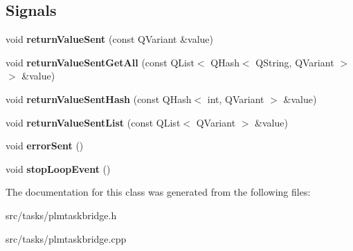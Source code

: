 \subsection*{Signals}
\begin{DoxyCompactItemize}
\item 
void {\bfseries return\+Value\+Sent} (const Q\+Variant \&value)\hypertarget{class_p_l_m_task_bridge_ad144c31db4e0f5d23092eab900a7298f}{}\label{class_p_l_m_task_bridge_ad144c31db4e0f5d23092eab900a7298f}

\item 
void {\bfseries return\+Value\+Sent\+Get\+All} (const Q\+List$<$ Q\+Hash$<$ Q\+String, Q\+Variant $>$ $>$ \&value)\hypertarget{class_p_l_m_task_bridge_ae8267e49794081614601e24b9eca0144}{}\label{class_p_l_m_task_bridge_ae8267e49794081614601e24b9eca0144}

\item 
void {\bfseries return\+Value\+Sent\+Hash} (const Q\+Hash$<$ int, Q\+Variant $>$ \&value)\hypertarget{class_p_l_m_task_bridge_a5e4267de935444128677563c0aa91798}{}\label{class_p_l_m_task_bridge_a5e4267de935444128677563c0aa91798}

\item 
void {\bfseries return\+Value\+Sent\+List} (const Q\+List$<$ Q\+Variant $>$ \&value)\hypertarget{class_p_l_m_task_bridge_a4dff354383d5541cdb4bb50e96eeb32c}{}\label{class_p_l_m_task_bridge_a4dff354383d5541cdb4bb50e96eeb32c}

\item 
void {\bfseries error\+Sent} ()\hypertarget{class_p_l_m_task_bridge_a112c2296d8833638e8c4e67f3c97a494}{}\label{class_p_l_m_task_bridge_a112c2296d8833638e8c4e67f3c97a494}

\item 
void {\bfseries stop\+Loop\+Event} ()\hypertarget{class_p_l_m_task_bridge_ab0d85fbde08b2646e221253fc303360a}{}\label{class_p_l_m_task_bridge_ab0d85fbde08b2646e221253fc303360a}

\end{DoxyCompactItemize}


The documentation for this class was generated from the following files\+:\begin{DoxyCompactItemize}
\item 
src/tasks/plmtaskbridge.\+h\item 
src/tasks/plmtaskbridge.\+cpp\end{DoxyCompactItemize}

